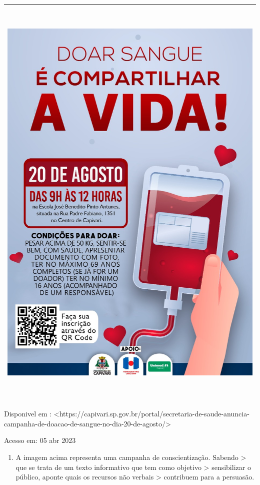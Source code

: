 \begin{longtable}[]{@{}l@{}}
\toprule
\endhead
\includegraphics[width=5.76042in,height=8.15278in]{./imgSAEB_7_POR/media/image1.png} \\
\bottomrule
\end{longtable}

Disponivel em :
\textless https://capivari.sp.gov.br/portal/secretaria-de-saude-anuncia-campanha-de-doacao-de-sangue-no-dia-20-de-agosto/\textgreater{}

Acesso em: 05 abr 2023

\begin{enumerate}
\def\labelenumi{\arabic{enumi})}
\tightlist
\item
  A imagem acima representa uma campanha de conscientização. Sabendo
  \textgreater{} que se trata de um texto informativo que tem como
  objetivo \textgreater{} sensibilizar o público, aponte quais os
  recursos não verbais \textgreater{} contribuem para a persuasão.
\end{enumerate}

